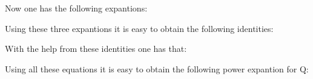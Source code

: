 \documentclass[a4paper,a4paper]{article}
\begin{document}
Now one has the following expantions:
\begin{center}
\setlength{\baselineskip}{30pt} 
{  \coordHE{} }
\end{center}
\begin{center}
\setlength{\baselineskip}{30pt} 
{  \coordHE{} }
\end{center}
Using these three expantions it is easy to obtain the following identities:

\begin{center}
 
{  \coordHE{}}
\end{center} 
\begin{center}
 
{  \coordHE{}}
\end{center} 
\begin{center}
 
{  \coordHE{}}
\end{center}
\begin{center}
{  \coordHE{}}
\end{center} 
\begin{center}
 
{  \coordHE{}}
\end{center}

With the help from these identities one has that:
\begin{center}
{  \coordHE{}}

 

\end{center}
Using all these equations it is easy to obtain the following power expantion for Q:
 
\end{document}
